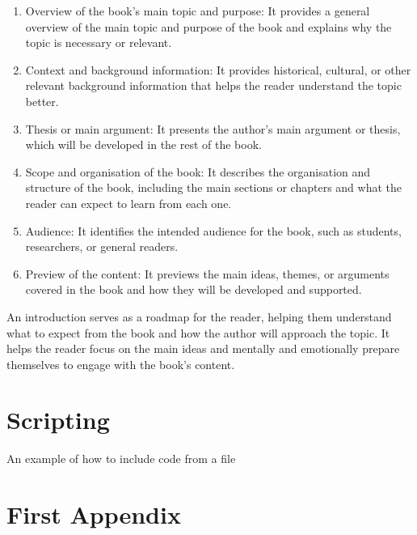 \documentclass[12pt, twoside, a4paper]{book}
\begin{document}
\begin{enumerate}
    \item Overview of the book's main topic and purpose: It provides a general overview of the main topic and purpose of the book and explains why the topic is necessary or relevant.

    \item Context and background information: It provides historical, cultural, or other relevant background information that helps the reader understand the topic better.

    \item Thesis or main argument: It presents the author's main argument or thesis, which will be developed in the rest of the book.

    \item Scope and organisation of the book: It describes the organisation and structure of the book, including the main sections or chapters and what the reader can expect to learn from each one.

    \item Audience: It identifies the intended audience for the book, such as students, researchers, or general readers.

    \item Preview of the content: It previews the main ideas, themes, or arguments covered in the book and how they will be developed and supported.

\end{enumerate}

An introduction serves as a roadmap for the reader, helping them understand what to expect from the book and how the author will approach the topic. It helps the reader focus on the main ideas and mentally and emotionally prepare themselves to engage with the book's content.

\chapter{Scripting}

An example of how to include code from a file



\appendix

\chapter{First Appendix}

\backmatter
\end{document}
